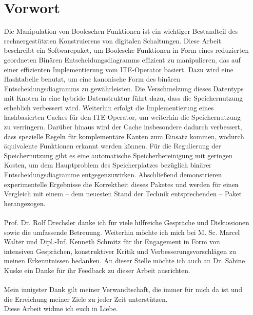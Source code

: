 \section*{Vorwort}
Die Manipulation von Booleschen Funktionen ist ein wichtiger Bestandteil des rechnergestützten Konstruierens von digitalen Schaltungen. Diese Arbeit beschreibt ein Softwarepaket, um Boolesche Funktionen in Form eines reduzierten geordneten Binären Entscheidungsdiagramms effizient zu manipulieren, das auf einer effizienten Implementierung vom ITE-Operator basiert. Dazu wird eine Hashtabelle benutzt, um eine kanonische Form des binären Entscheidungsdiagramms zu gewährleisten. Die Verschmelzung dieses Datentyps mit Knoten in eine hybride Datenstruktur führt dazu, dass die Speichernutzung erheblich verbessert wird. Weiterhin erfolgt die Implementierung eines hashbasierten Caches für den ITE-Operator, um weiterhin die Speichernutzung zu verringern. Darüber hinaus wird der Cache insbesondere dadurch verbessert, dass spezielle Regeln für komplementäre Kanten zum Einsatz kommen, wodurch äquivalente Funktionen erkannt werden können. Für die Regulierung der Speichernutzung gibt es eine automatische Speicherbereinigung mit geringen Kosten, um dem Hauptproblem des Speicherplatzes bezüglich binärer Entscheidungsdiagramme entgegenzuwirken. Abschließend demonstrieren experimentelle Ergebnisse die Korrektheit dieses Paketes und werden für einen Vergleich mit einem -- dem neuesten Stand der Technik entsprechenden -- Paket herangezogen.\\\\
Prof. Dr. Rolf Drechsler danke ich für viele hilfreiche Gespräche und Diskussionen sowie die umfassende Betreuung. Weiterhin möchte ich mich bei M. Sc. Marcel Walter und Dipl.-Inf. Kenneth Schmitz für ihr Engagement in Form von intensiven Gesprächen, konstruktiver Kritik und Verbesserungsvorschlägen zu meinen Erkenntnissen bedanken. An dieser Stelle möchte ich auch an Dr. Sabine Kuske ein Danke für ihr Feedback zu dieser Arbeit ausrichten.\\\\
Mein innigster Dank gilt meiner Verwandtschaft, die immer für mich da ist und die Erreichung meiner Ziele zu jeder Zeit unterstützen.\\
Diese Arbeit widme ich euch in Liebe.